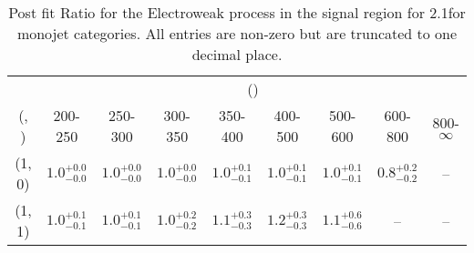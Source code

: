 \begin{table}[h!]
\tiny
\centering
\caption{Post fit Ratio for the Electroweak process in the signal region for 2.1\ifb for monojet categories. All entries are non-zero but are truncated to one decimal place.\label{tab:ratioseppost_sig_ewk_mono}}
\begin{tabular}
{ccccccccc}
	\hline\hline
	& \multicolumn{8}{c}{\scalht (\gev)} \\ 
	 (\njet,  \nb) & 200-250 & 250-300 & 300-350 & 350-400 & 400-500 & 500-600 & 600-800 & 800-$\infty$ \\ [0.8ex] 
\hline
	(1, 0) & $1.0^{+ 0.0 }_{- 0.0 }$ & $1.0^{+ 0.0 }_{- 0.0 }$ & $1.0^{+ 0.0 }_{- 0.0 }$ & $1.0^{+ 0.1 }_{- 0.1 }$ & $1.0^{+ 0.1 }_{- 0.1 }$ & $1.0^{+ 0.1 }_{- 0.1 }$ & $0.8^{+ 0.2 }_{- 0.2 }$ & -- \\[0.5ex] 
	(1, 1) & $1.0^{+ 0.1 }_{- 0.1 }$ & $1.0^{+ 0.1 }_{- 0.1 }$ & $1.0^{+ 0.2 }_{- 0.2 }$ & $1.1^{+ 0.3 }_{- 0.3 }$ & $1.2^{+ 0.3 }_{- 0.3 }$ & $1.1^{+ 0.6 }_{- 0.6 }$ & -- & -- \\[0.5ex] 
	\hline
	\hline
\end{tabular}
\end{table}
